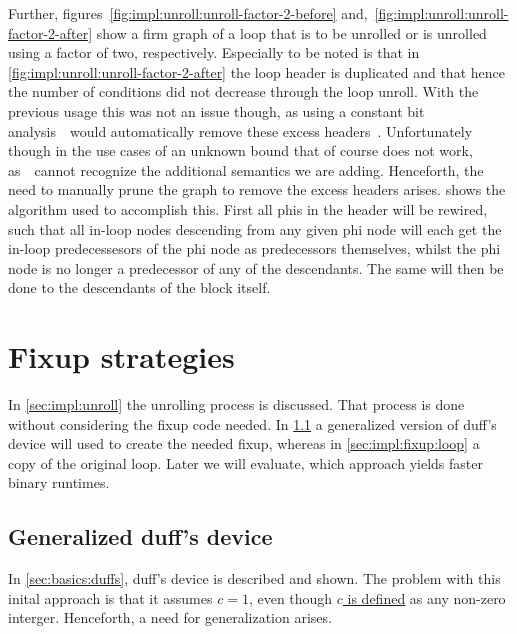 Further, figures~\ref{fig:impl:unroll:unroll-factor-2-before} and,~\ref{fig:impl:unroll:unroll-factor-2-after} show a firm graph of a loop that is to be unrolled or is unrolled using a factor of two, respectively.
Especially to be noted is that in \cref{fig:impl:unroll:unroll-factor-2-after} the loop header is duplicated and that hence the number of conditions did not decrease through the loop unroll.
With the previous usage this was not an issue though, as using a constant bit analysis~\libFIRM~would automatically remove these excess headers~\cite{aebi18bachelorarbeit}.
Unfortunately though in the use cases of an unknown bound that of course does not work, as~\libFIRM~cannot recognize the additional semantics we are adding.
Henceforth, the need to manually prune the graph to remove the excess headers arises.
 shows the algorithm used to accomplish this.
First all phis in the header will be rewired, such that all in-loop nodes descending from any given phi node will each get the in-loop predecessesors of the phi node as predecessors themselves, whilst the phi node is no longer a predecessor of any of the descendants.
The same will then be done to the descendants of the block itself.







\section{Fixup strategies}\label{sec:impl:fixup}

In \cref{sec:impl:unroll} the unrolling process is discussed.
That process is done without considering the fixup code needed.
In \cref{sec:impl:fixup:duff} a generalized version of duff's device will used to create the needed fixup, whereas in \cref{sec:impl:fixup:loop} a copy of the original loop.
Later we will evaluate, which approach yields faster binary runtimes.

\subsection{Generalized duff's device}\label{sec:impl:fixup:duff}

In \cref{sec:basics:duffs}, duff's device is described and shown.
The problem with this inital approach is that it assumes $c = 1$, even though \hyperref[sec:impl::def-c]{$c$ is defined} as any non-zero interger.
Henceforth, a need for generalization arises.

